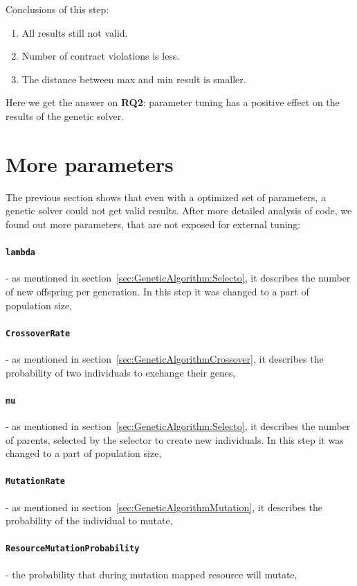 Conclusions of this step:

\begin{enumerate}
	\item All results still not valid.
	\item Number of contract violations is less.
	\item The distance between max and min result is smaller.
\end{enumerate}

Here we get the answer on \textbf{RQ2}: parameter tuning has a positive effect on the results of the genetic solver.

\section{More parameters}

The previous section shows that even with a optimized set of parameters, a genetic solver could not get valid results.
After more detailed analysis of code, we found out more parameters, that are not exposed for external tuning:
	 \paragraph{\texttt{lambda}} - as mentioned in section~\ref{sec:GeneticAlgorithm:Selecto}, it describes the number of new offspring per generation. In this step it was changed to a part of population size,
	 \paragraph{\texttt{CrossoverRate}} - as mentioned in section~\ref{sec:GeneticAlgorithmCrossover}, it describes the probability of two individuals to exchange their genes,
	 \paragraph{\texttt{mu}} - as mentioned in section~\ref{sec:GeneticAlgorithm:Selecto}, it describes the number of parents, selected by the selector to create new individuals. In this step it was changed to a part of population size,
	 \paragraph{\texttt{MutationRate}} - as mentioned in section~\ref{sec:GeneticAlgorithmMutation}, it describes the probability of the individual to mutate,
	 \paragraph{\texttt{ResourceMutationProbability}} - the probability that during mutation mapped resource will mutate,
